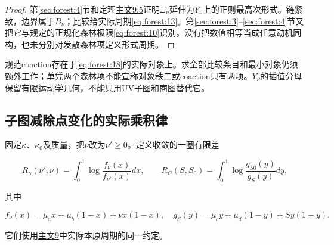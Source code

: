 \documentclass[11pt,a4paper,oneside]{ctexart}
\theoremstyle{cnplain}
\theoremstyle{definition}
\theoremstyle{remark}
\numberwithin{equation}{section}
\newcommand{\otherref}[2]{\href{#1.pdf}{#2}}
\begin{document}
\begin{proof}

第\ref{sec:forest:4}节和定理\otherref{feynman_periods_long_paper}{主文9.5}证明\(\Xi _\nu \)延伸为\(Y_\nu \)上的正则最高次形式。链紧致，边界属于\(B_\nu \)；比较给实际周期\eqref{eq:forest:13}。第\ref{sec:forest:3}--\ref{sec:forest:4}节又把它与规定的正规化森林极限\eqref{eq:forest:10}识别。没有把数值相等当成任意动机同构，也未分别对发散森林项定义形式周期。

\end{proof}

规范coaction存在于\eqref{eq:forest:18}的实际对象上。求全部比较条目和最小对象仍须额外工作；单凭两个森林项不能宣称对象秩二或coaction只有两项。\(Y_\nu \)的插值分母保留有限运动学几何，不能只用UV子图和商图替代它。


\subsection{子图减除点变化的实际乘积律}\label{sec:forest:6}

固定\(\kappa \)、\(\kappa _0\)及质量，把\(\nu \)改为\(\nu '\ge 0\)。定义收敛的一圈有限差

\begin{equation}
R_\gamma(\nu',\nu)=\int_0^1
              \log\frac{f_\nu(x)}{f_{\nu'}(x)}dx,\qquad
 R_C(S,S_0)=\int_0^1\log\frac{g_{S0}(y)}{g_S(y)}dy,             \label{eq:forest:19}
\end{equation}

其中

\begin{equation}
f_\nu(x)=\mu_a x+\mu_b(1-x)+\nu x(1-x),\quad
 g_S(y)=\mu_c y+\mu_d(1-y)+S y(1-y).
\end{equation}

它们使用\otherref{feynman_periods_long_paper}{主文9}中实际本原周期的同一约定。
\end{document}
